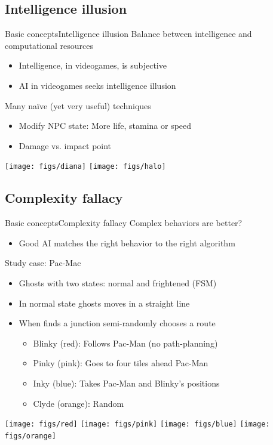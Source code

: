 \documentclass[10pt,compress]{beamer} %
\begin{document}
\subsection{Intelligence illusion}
\begin{frame}{Basic concepts}{Intelligence illusion}
	Balance between intelligence and computational resources
  	\begin{itemize}
		\item Intelligence, in videogames, is subjective
		\item AI in videogames seeks \alert{intelligence illusion}
	\end{itemize}
	Many na\"ive (yet very useful) techniques
	\begin{itemize}
		\item Modify NPC state: More life, stamina or speed
		\item Damage vs. impact point
	\end{itemize}
	\begin{center}
		\texttt{[image: figs/diana]}
		\vspace{1cm}
		\texttt{[image: figs/halo]}
	\end{center}
\end{frame}

\subsection{Complexity fallacy}
\begin{frame}{Basic concepts}{Complexity fallacy}
	Complex behaviors are better?
  	\begin{itemize}
		\item Good AI matches the right behavior to the right algorithm
	\end{itemize}
	Study case: Pac-Mac
	\begin{itemize}
		\item Ghosts with two states: normal and frightened (FSM)
		\item In normal state ghosts moves in a straight line
		\item When finds a junction semi-randomly chooses a route
		\begin{itemize}
			\item Blinky (red): Follows Pac-Man (no path-planning)
			\item Pinky (pink): Goes to four tiles ahead Pac-Man
			\item Inky (blue): Takes Pac-Man and Blinky's positions
			\item Clyde (orange): Random
		\end{itemize}
	\end{itemize}
	\begin{center}
		\texttt{[image: figs/red]}\hspace{0.5cm}
		\texttt{[image: figs/pink]}\hspace{0.5cm}
		\texttt{[image: figs/blue]}\hspace{0.5cm}
		\texttt{[image: figs/orange]}
	\end{center}
\end{frame}
\end{document}
